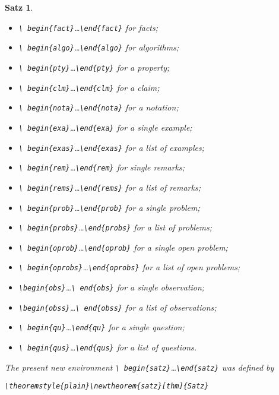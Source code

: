 \documentclass{lmcs} %
\theoremstyle{plain}\newtheorem{satz}[thm]{Satz} %
\begin{document}
\begin{satz}
\begin{itemize}
\begin{itemize}
{{    begin\{conj\}}\dots\texttt{\textbackslash end\{conj\}}} for a conjecture;
\item\emph{\texttt{\textbackslash
    begin\{fact\}}\dots\texttt{\textbackslash end\{fact\}}} for facts;
\item\emph{\texttt{\textbackslash
    begin\{algo\}}\dots\texttt{\textbackslash end\{algo\}}} for algorithms;
\item\emph{\texttt{\textbackslash
    begin\{pty\}}\dots\texttt{\textbackslash end\{pty\}}} for a property;
\item\emph{\texttt{\textbackslash
    begin\{clm\}}\dots\texttt{\textbackslash end\{clm\}}} for a claim;
\item\emph{\texttt{\textbackslash
    begin\{nota\}}\dots\texttt{\textbackslash end\{nota\}}} for a notation;
\item\emph{\texttt{\textbackslash
    begin\{exa\}}\dots\texttt{\textbackslash end\{exa\}}} for a single example;
\item\emph{\texttt{\textbackslash
    begin\{exas\}}\dots\texttt{\textbackslash end\{exas\}}} for a list of examples;
\item\emph{\texttt{\textbackslash
    begin\{rem\}}\dots\texttt{\textbackslash end\{rem\}}} for single remarks;
\item\emph{\texttt{\textbackslash
    begin\{rems\}}\dots\texttt{\textbackslash end\{rems\}}} for a list of remarks;
\item\emph{\texttt{\textbackslash
    begin\{prob\}}\dots\texttt{\textbackslash end\{prob\}}} for a
  single problem;
\item\emph{\texttt{\textbackslash
  begin\{probs\}}\dots\texttt{\textbackslash end\{probs\}}} for a list
  of problems;
\item\emph{\texttt{\textbackslash
    begin\{oprob\}}\dots\texttt{\textbackslash end\{oprob\}}} for a single open problem;
\item\emph{\texttt{\textbackslash
    begin\{oprobs\}}\dots\texttt{\textbackslash end\{oprobs\}}} for a
  list of open problems;
\item\emph{\texttt{\textbackslash begin\{obs\}}\dots\texttt{\textbackslash
  end\{obs\}}} for a single observation;
\item\emph{\texttt{\textbackslash begin\{obss\}}\dots\texttt{\textbackslash
  end\{obss\}}} for a list of observations;
\item\emph{\texttt{\textbackslash
    begin\{qu\}}\dots\texttt{\textbackslash end\{qu\}}} for a single question;
\item\emph{\texttt{\textbackslash
    begin\{qus\}}\dots\texttt{\textbackslash end\{qus\}}} for a list of questions.
\end{itemize}
\end{itemize}
  The present new environment \emph{\texttt{\textbackslash
    begin\{satz\}}\dots\texttt{\textbackslash end\{satz\}}} was defined
  by
\begin{center}
  \emph{\texttt{\textbackslash theoremstyle\{plain\}\textbackslash newtheorem\{satz\}[thm]\{Satz\}}}
\end{center}
\end{satz}
\end{document}
